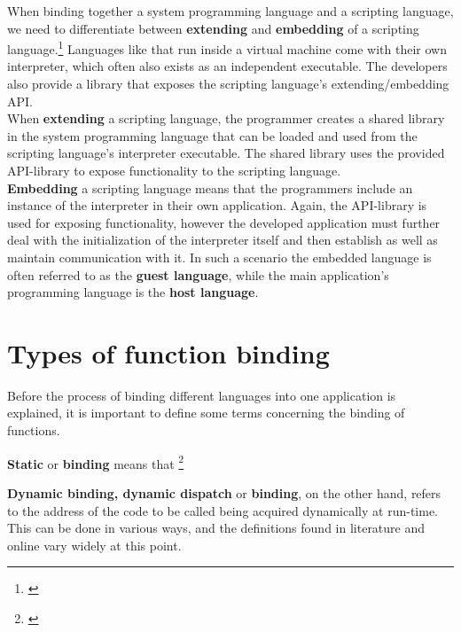 When binding together a system programming language and a scripting language, we need to differentiate between \textbf{extending} and \textbf{embedding} of a scripting language.\footnote{\citep{PythonHP}} Languages like  that run inside a virtual machine come with their own interpreter, which often also exists as an independent executable. The developers also provide a library that exposes the scripting language's extending/embedding API. \\
When \textbf{extending} a scripting language, the programmer creates a shared library in the system programming language that can be loaded and used from the scripting language's interpreter executable. The shared library uses the provided API-library to expose functionality to the scripting language.\\
\textbf{Embedding} a scripting language means that the programmers include an instance of the interpreter in their own application. Again, the API-library is used for exposing functionality, however the developed application must further deal with the initialization of the interpreter itself and then establish as well as maintain communication with it. In such a scenario the embedded language is often referred to as the \textbf{guest language}, while the main application's programming language is the \textbf{host language}.

\section{Types of function binding}
\label{sec:TypesOfFunctionBinding}

Before the process of binding different languages into one application is explained, it is important to define some terms concerning the binding of functions.

\textbf{Static} or \textbf{ binding} means that \footnote{\citep[41]{ThinkingInCPP}}

\textbf{Dynamic binding, dynamic dispatch} or \textbf{ binding}, on the other hand, refers to the address of the code to be called being acquired dynamically at run-time. This can be done in various ways, and the definitions found in literature and online vary widely at this point.

